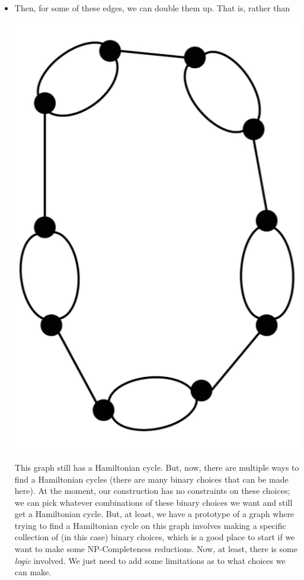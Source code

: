 \documentclass[letterpaper]{article}
\begin{document}
\begin{itemize}
    \item Then, for some of these edges, we can double them up. That is, rather than 
    \begin{center}
        \includegraphics[scale=0.35]{assets/zoe_ham_2.png}
    \end{center}
    This graph still has a Hamiltonian cycle. But, now, there are multiple ways to find a Hamiltonian cycles (there are many binary choices that can be made here). At the moment, our construction has no constraints on these choices; we can pick whatever combinations of these binary choices we want and still get a Hamiltonian cycle. But, at least, we have a prototype of a graph where trying to find a Hamiltonian cycle on this graph involves making a specific collection of (in this case) binary choices, which is a good place to start if we want to make some NP-Completeness reductions. Now, at least, there is some \emph{logic} involved. We just need to add some limitations as to what choices we can make. 


\end{itemize}
\end{document}
